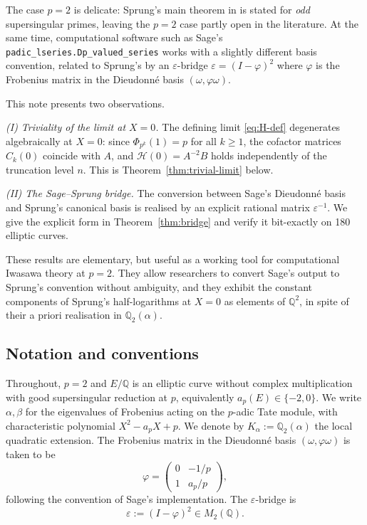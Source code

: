 \documentclass[11pt,a4paper]{amsart}
\theoremstyle{definition}
\newcommand{\Q}{\mathbb{Q}}
\newcommand{\eps}{\varepsilon}
\newcommand{\Hcal}{\mathcal{H}}
\begin{document}
The case $p = 2$ is delicate: Sprung's main theorem in \cite{Sprung2016} is stated for \emph{odd} supersingular primes, leaving the $p = 2$ case partly open in the literature. At the same time, computational software such as Sage's \texttt{padic\_lseries.Dp\_valued\_series} \cite{Sage} works with a slightly different basis convention, related to Sprung's by an $\eps$-bridge $\eps = (I - \varphi)^2$ where $\varphi$ is the Frobenius matrix in the Dieudonné basis $(\omega, \varphi\omega)$.

This note presents two observations.

\emph{(I) Triviality of the limit at $X=0$.} The defining limit \eqref{eq:H-def} degenerates algebraically at $X = 0$: since $\Phi_{p^k}(1) = p$ for all $k \geq 1$, the cofactor matrices $C_k(0)$ coincide with $A$, and $\Hcal(0) = A^{-2} B$ holds independently of the truncation level $n$. This is Theorem~\ref{thm:trivial-limit} below.

\emph{(II) The Sage--Sprung bridge.} The conversion between Sage's Dieudonné basis and Sprung's canonical basis is realised by an explicit rational matrix $\eps^{-1}$. We give the explicit form in Theorem~\ref{thm:bridge} and verify it bit-exactly on 180 elliptic curves.

These results are elementary, but useful as a working tool for computational Iwasawa theory at $p = 2$. They allow researchers to convert Sage's output to Sprung's convention without ambiguity, and they exhibit the constant components of Sprung's half-logarithms at $X = 0$ as elements of $\Q^2$, in spite of their a priori realisation in $\Q_2(\alpha)$.

\subsection*{Notation and conventions}
Throughout, $p = 2$ and $E/\Q$ is an elliptic curve without complex multiplication with good supersingular reduction at $p$, equivalently $a_p(E) \in \{-2, 0\}$. We write $\alpha, \beta$ for the eigenvalues of Frobenius acting on the $p$-adic Tate module, with characteristic polynomial $X^2 - a_p X + p$. We denote by $K_\alpha := \Q_2(\alpha)$ the local quadratic extension. The Frobenius matrix in the Dieudonné basis $(\omega, \varphi\omega)$ is taken to be
\begin{equation}
\varphi = \begin{pmatrix} 0 & -1/p \\ 1 & a_p/p \end{pmatrix},
\end{equation}
following the convention of Sage's implementation. The $\eps$-bridge is
\begin{equation}
\eps := (I - \varphi)^2 \in M_2(\Q).
\end{equation}
\end{document}
